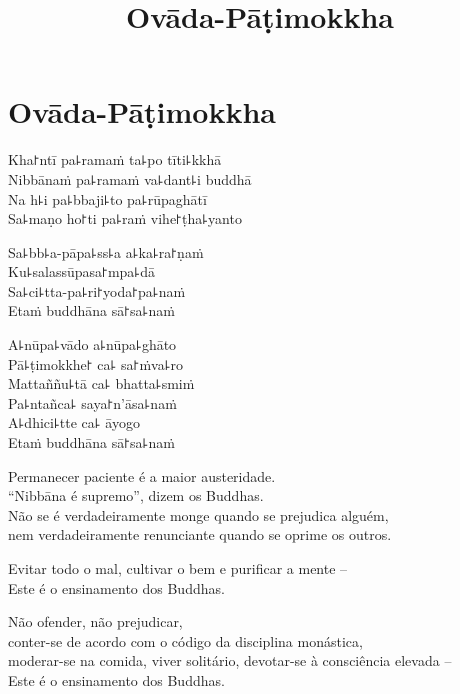 \documentclass[
  babelLanguage=portuguese,
  final,
]{chantingbook}
\title{Ovāda-Pāṭimokkha}
\begin{document}
\mainmatter

\eveningChapterSettings

\chapter{Ovāda-Pāṭimokkha}

\thispagestyle{empty}

\enlargethispage{2\baselineskip}

\begin{leader}
\end{leader}

Kha꜓ntī pa꜕ramaṁ ta꜕po tīti꜕kkhā\\
Nibbānaṁ pa꜕ramaṁ va꜕dant꜕i buddhā\\
Na h꜕i pa꜕bbaji꜕to pa꜕rūpaghātī\\
Sa꜕maṇo ho꜓ti pa꜕raṁ vihe꜓ṭha꜕yanto

Sa꜕bb꜕a-pāpa꜕ss꜕a a꜕ka꜕ra꜓ṇaṁ\\
Ku꜕salassūpasa꜓mpa꜕dā\\
Sa꜕ci꜕tta-pa꜕ri꜓yoda꜓pa꜕naṁ\\
Etaṁ buddhāna sā꜓sa꜕naṁ

A꜕nūpa꜕vādo a꜕nūpa꜕ghāto\\
Pā꜕ṭimokkhe꜓ ca꜕ sa꜓ṁva꜕ro\\
Mattaññu꜕tā ca꜕ bhatta꜕smiṁ\\
Pa꜕ntañca꜕ saya꜓n'āsa꜕naṁ\\
A꜕dhici꜕tte ca꜕ āyogo\\
Etaṁ buddhāna sā꜓sa꜕naṁ

\bigskip

{\itshape

Permanecer paciente é a maior austeridade.\\
“Nibbāna é supremo”, dizem os Buddhas.\\
Não se é verdadeiramente monge quando se prejudica alguém,\\
nem verdadeiramente renunciante quando se oprime os outros.

Evitar todo o mal, cultivar o bem e purificar a mente --\\
Este é o ensinamento dos Buddhas.

Não ofender, não prejudicar,\\
conter-se de acordo com o código da disciplina monástica,\\
moderar-se na comida, viver solitário, devotar-se à consciência elevada --\\
Este é o ensinamento dos Buddhas.

}
\end{document}
